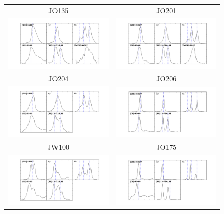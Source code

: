 \documentclass[fleqn,usenatbib]{mnras}
\begin{document}
\begin{figure}
	\begin{tabular}{cc}
		JO135 & JO201\\	
		\includegraphics[width=.5\linewidth]{Plots/alines_peak_JO135}	& \includegraphics[width=.5\linewidth]{Plots/alines_peak_JO201} \\
		JO204 & JO206\\
		\includegraphics[width=.5\linewidth]{Plots/alines_peak_JO204}&
		\includegraphics[width=.5\linewidth]{Plots/alines_peak_JO206}\\
		JW100 & JO175\\
		\includegraphics[width=.5\linewidth]{Plots/alines_peak_JW100} & 
		\includegraphics[width=.5\linewidth]{Plots/alines_peak_JO175}\\

\end{tabular}
\end{figure}
\end{document}
